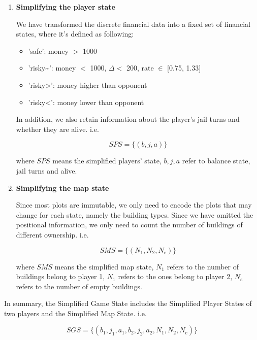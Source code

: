 \documentclass{article}
\begin{document}
    \begin{enumerate}
        \item 
        \textbf{Simplifying the player state}
    
            We have transformed the discrete financial data into a fixed set of financial states, where it's defined as following:
            \begin{itemize}
                \item 'safe': money $>$ 1000
                \item 'risky\textasciitilde': money $<$ 1000, $\Delta <$ 200, rate $\in$ [0.75, 1.33]
                \item 'risky\textgreater': money higher than opponent
                \item 'risky\textless': money lower than opponent
            \end{itemize}
            
            In addition, we also retain information about the player's jail turns and whether they are alive.
            i.e.
    
            \[
                SPS = \{ (b, j, a) \}
            \]
    
            where \( SPS \) means the simplified players' state, \( b, j, a \) refer to balance state, jail turns and alive.
        
        \item
        \textbf{Simplifying the map state}
            
            Since most plots are immutable, we only need to encode the plots that may change for each state, namely the building types. Since we have omitted the positional information, we only need to count the number of buildings of different ownership.
            i.e.
    
            \[
                SMS = \{ (N_1, N_2, N_e) \}
            \]
    
            where \( SMS \) means the simplified map state, \( N_1 \) refers to the number of buildings belong to player 1, \( N_1 \) refers to the ones belong to player 2, \( N_e \) refers to the number of empty buildings.
    \end{enumerate}
    
    In summary, the Simplified Game State includes the Simplified Player States of two players and the Simplified Map State.
    i.e.
    
    \[
        SGS = \{ (b_1, j_1, a_1, b_2, j_2, a_2, N_1, N_2, N_e) \}
    \]
\end{document}
